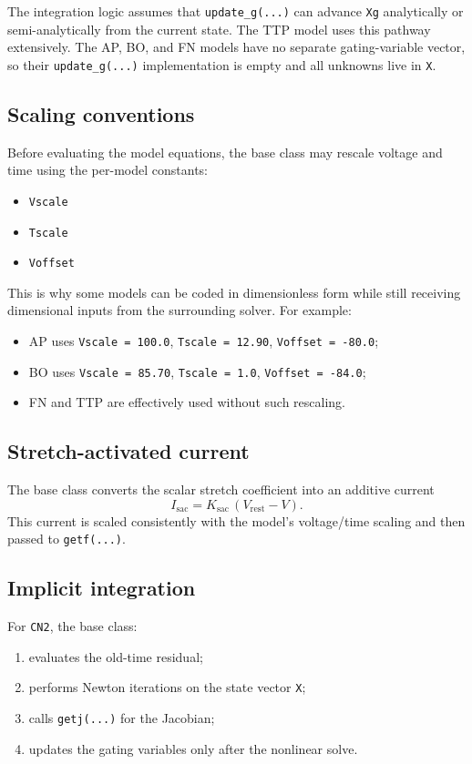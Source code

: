 \documentclass[11pt]{article}
\begin{document}
The integration logic assumes that \texttt{update\_g(...)} can advance \texttt{Xg} analytically or semi-analytically from the current state. The TTP model uses this pathway extensively. The AP, BO, and FN models have no separate gating-variable vector, so their \texttt{update\_g(...)} implementation is empty and all unknowns live in \texttt{X}.

\subsection{Scaling conventions}

Before evaluating the model equations, the base class may rescale voltage and time using the per-model constants:
\begin{itemize}[leftmargin=*]
\item \texttt{Vscale}
\item \texttt{Tscale}
\item \texttt{Voffset}
\end{itemize}

This is why some models can be coded in dimensionless form while still receiving dimensional inputs from the surrounding solver. For example:
\begin{itemize}[leftmargin=*]
\item AP uses \texttt{Vscale = 100.0}, \texttt{Tscale = 12.90}, \texttt{Voffset = -80.0};
\item BO uses \texttt{Vscale = 85.70}, \texttt{Tscale = 1.0}, \texttt{Voffset = -84.0};
\item FN and TTP are effectively used without such rescaling.
\end{itemize}

\subsection{Stretch-activated current}

The base class converts the scalar stretch coefficient into an additive current
\[
I_{\mathrm{sac}} = K_{\mathrm{sac}} \, (V_{\mathrm{rest}} - V).
\]
This current is scaled consistently with the model's voltage/time scaling and then passed to \texttt{getf(...)}.

\subsection{Implicit integration}

For \texttt{CN2}, the base class:
\begin{enumerate}[leftmargin=*]
\item evaluates the old-time residual;
\item performs Newton iterations on the state vector \texttt{X};
\item calls \texttt{getj(...)} for the Jacobian;
\item updates the gating variables only after the nonlinear solve.
\end{enumerate}
\end{document}
